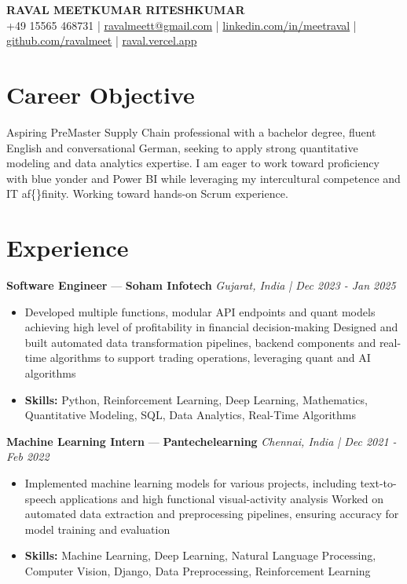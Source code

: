 \documentclass[a4paper,10pt]{article}
\begin{document}
\begin{center}
  {\Large\bfseries RAVAL MEETKUMAR RITESHKUMAR}\\[2pt]
  {\small +49 15565 468731 \;|\; \href{mailto:ravalmeett@gmail.com}{ravalmeett@gmail.com} \;|\; \href{https://www.linkedin.com/in/meetraval/}{linkedin.com/in/meetraval} \;|\; \href{https://github.com/ravalmeet}{github.com/ravalmeet} \;|\; \href{https://raval.vercel.app/}{raval.vercel.app}}
\end{center}
\vspace{-3pt}

\section*{Career Objective}
Aspiring PreMaster Supply Chain professional with a bachelor degree, fluent English and conversational German, seeking to apply strong quantitative modeling and data analytics expertise. I am eager to work toward proficiency with blue yonder and Power BI while leveraging my intercultural competence and IT af\{\}finity. Working toward hands-on Scrum experience.\par

\section*{Experience}
\textbf{Software Engineer} — \textbf{Soham Infotech} \hfill \textit{Gujarat, India \;|\; Dec 2023 - Jan 2025}\par
\vspace{1pt}
\begin{itemize}
  \item Developed multiple functions, modular API endpoints and quant models achieving high level of profitability in financial decision-making Designed and built automated data transformation pipelines, backend components and real-time algorithms to support trading operations, leveraging quant and AI algorithms
  \item \textbf{Skills:} Python, Reinforcement Learning, Deep Learning, Mathematics, Quantitative Modeling, SQL, Data Analytics, Real-Time Algorithms
\end{itemize}
\vspace{3pt}
\textbf{Machine Learning Intern} — \textbf{Pantechelearning} \hfill \textit{Chennai, India \;|\; Dec 2021 - Feb 2022}\par
\vspace{1pt}
\begin{itemize}
  \item Implemented machine learning models for various projects, including text-to-speech applications and high functional visual-activity analysis Worked on automated data extraction and preprocessing pipelines, ensuring accuracy for model training and evaluation
  \item \textbf{Skills:} Machine Learning, Deep Learning, Natural Language Processing, Computer Vision, Django, Data Preprocessing, Reinforcement Learning
\end{itemize}
\end{document}
